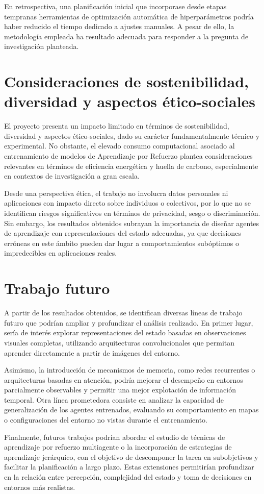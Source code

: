 En retrospectiva, una planificación inicial que incorporase desde etapas tempranas herramientas de optimización automática de hiperparámetros podría haber reducido el tiempo dedicado a ajustes manuales. A pesar de ello, la metodología empleada ha resultado adecuada para responder a la pregunta de investigación planteada.

\section{Consideraciones de sostenibilidad, diversidad y aspectos ético-sociales}

El proyecto presenta un impacto limitado en términos de sostenibilidad, diversidad y aspectos ético-sociales, dado su carácter fundamentalmente técnico y experimental. No obstante, el elevado consumo computacional asociado al entrenamiento de modelos de Aprendizaje por Refuerzo plantea consideraciones relevantes en términos de eficiencia energética y huella de carbono, especialmente en contextos de investigación a gran escala.

Desde una perspectiva ética, el trabajo no involucra datos personales ni aplicaciones con impacto directo sobre individuos o colectivos, por lo que no se identifican riesgos significativos en términos de privacidad, sesgo o discriminación. Sin embargo, los resultados obtenidos subrayan la importancia de diseñar agentes de aprendizaje con representaciones del estado adecuadas, ya que decisiones erróneas en este ámbito pueden dar lugar a comportamientos subóptimos o impredecibles en aplicaciones reales.

\section{Trabajo futuro}

A partir de los resultados obtenidos, se identifican diversas líneas de trabajo futuro que podrían ampliar y profundizar el análisis realizado. En primer lugar, sería de interés explorar representaciones del estado basadas en observaciones visuales completas, utilizando arquitecturas convolucionales que permitan aprender directamente a partir de imágenes del entorno.

Asimismo, la introducción de mecanismos de memoria, como redes recurrentes o arquitecturas basadas en atención, podría mejorar el desempeño en entornos parcialmente observables y permitir una mejor explotación de información temporal. Otra línea prometedora consiste en analizar la capacidad de generalización de los agentes entrenados, evaluando su comportamiento en mapas o configuraciones del entorno no vistas durante el entrenamiento.

Finalmente, futuros trabajos podrían abordar el estudio de técnicas de aprendizaje por refuerzo multiagente o la incorporación de estrategias de aprendizaje jerárquico, con el objetivo de descomponer la tarea en subobjetivos y facilitar la planificación a largo plazo. Estas extensiones permitirían profundizar en la relación entre percepción, complejidad del estado y toma de decisiones en entornos más realistas.

